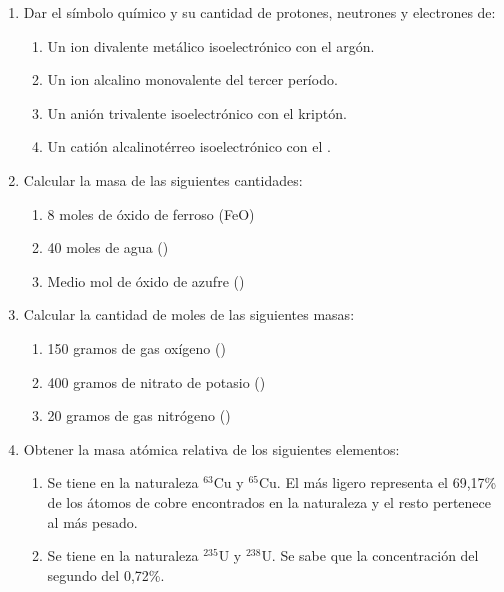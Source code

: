 \begin{enumerate}
\item Dar el símbolo químico y su cantidad de protones, neutrones y electrones de: 
\begin{enumerate}
    \item Un ion divalente metálico isoelectrónico con el argón.

    \item Un ion alcalino monovalente del tercer período.

    \item Un anión trivalente isoelectrónico con el kriptón.

    \item Un catión alcalinotérreo isoelectrónico con el .
\end{enumerate}


\item Calcular la masa de las siguientes cantidades:
\begin{enumerate}
    \item 8 moles de óxido de ferroso (FeO) %

    \item 40 moles de agua () %

    \item Medio mol de óxido de azufre () %
\end{enumerate}


\item Calcular la cantidad de moles de las siguientes masas:
\begin{enumerate}
    \item 150 gramos de gas oxígeno () %

    \item 400 gramos de nitrato de potasio () %

    \item 20 gramos de gas nitrógeno () %
\end{enumerate}


\item Obtener la masa atómica relativa de los siguientes elementos:
\begin{enumerate}
    \item Se tiene en la naturaleza $^{63}$Cu y $^{65}$Cu. El más ligero representa el 69,17\% de los átomos de cobre encontrados en la naturaleza y el resto pertenece al más pesado.

    \item Se tiene en la naturaleza $^{235}$U y $^{238}$U. Se sabe que la concentración del segundo del 0,72\%.


\end{enumerate}
\end{enumerate}
